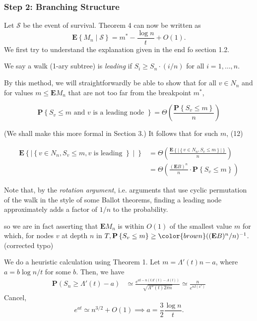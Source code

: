 \subsubsection{Step 2: Branching Structure}
Let $\mathscr{S}$ be the event of survival. Theorem 4 can now be written as
\[
\mathbf{E}\left\{M_n \mid \mathscr{S}\right\}=m^*-\frac{\log n}{t}+O(1).
\]
We first try to understand the explanation given in the end fo section 1.2. 

We say a walk (1-ary subtree) is \textit{leading} if $S_i \geq S_n \cdot(i / n)$ for all $i=1, \ldots, n$.



\begin{tcolorbox}[title=,colback=gray!10,colframe=black,breakable]
    By this method, we will straightforwardly be able to show that for all $v \in N_n$ and for values $m \leq \mathbf{E} M_n$ that are not too far from the breakpoint $m^*$,

\[
\mathbf{P}\left\{S_v \leq m \text { and } v \text { is a leading node }\right\}=\Theta\left(\frac{\mathbf{P}\left\{S_v \leq m\right\}}{n}\right)
\]

(We shall make this more formal in Section 3.) It follows that for such $m$,
(12)

\[
\begin{aligned}
\mathbf{E}\left\{\mid\left\{v \in N_n, S_v \leq m, v \text { is leading }\right\} \mid\right\} & =\Theta\left(\frac{\mathbf{E}\left\{\left|\left\{v \in N_n, S_v \leq m\right\}\right|\right\}}{n}\right) \\
& =\Theta\left(\frac{(\mathbf{E} B)^n}{n} \cdot \mathbf{P}\left\{S_v \leq m\right\}\right)
\end{aligned}
\]
\end{tcolorbox}
Note that, by the \textit{rotation argument}, i.e. arguments that use cyclic permutation of the walk in the style of some Ballot theorems, finding a leading node approximately adds a factor of $1/n$ to the probability.
\drawpicture

\begin{tcolorbox}[title=,colback=gray!10,colframe=black,breakable]
so we are in fact asserting that $\mathbf{E} M_n$ is within $O(1)$ of the smallest value $m$ for which, for nodes $v$ at depth $n$ in $T, \mathbf{P}\left\{S_v \leq m\right\} \geq \color{brown}((\mathbf{E} B)^n / n)^{-1}$. (corrected typo)
\end{tcolorbox}

We do a heuristic calculation using Theorem 1. Let $m = \Lambda'(t) n - a$, where $a = b \log n / t$ for some $b$. Then, we have
\begin{align*}
    \mathbf{P}\left( S_n \ge \Lambda'(t) - a\right) 
    &\simeq \frac{e^{a t - n(t \Lambda'(t) - \Lambda(t))}}{\sqrt{\Lambda''(t) 2 \pi n}} \simeq \frac{n}{e^{n I(x^*)}}
\end{align*}
Cancel,
\[
e^{a t} \simeq n^{3 / 2} + O(1) \implies a = \frac{3}{2} \frac{\log n}{t}.
\]


